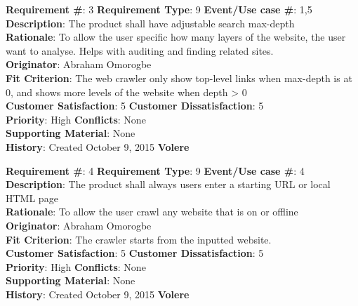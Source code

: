 \documentclass[12pt]{article}
\begin{document}
\begin{framed}
\textbf{Requirement \#}: 3 \hfill \textbf{Requirement Type}: 9 \hfill\textbf{Event/Use case \#}: 1,5 \hfill\\
\textbf{Description}:  The product shall have adjustable search max-depth\\
\textbf{Rationale}: To allow the user specific how many layers of the website, the user want to analyse. Helps with auditing and finding related sites.\\
\textbf{Originator}: Abraham Omorogbe\\
\textbf{Fit Criterion}: The web crawler only show top-level links when max-depth is at 0, and shows more levels of the website when depth > 0\\
\textbf{Customer Satisfaction}: 5 \hfill 	\textbf{Customer Dissatisfaction}: 5 \hfill\\
\textbf{Priority}: High \hfill \textbf{Conflicts}: None \hfill 		\\
\textbf{Supporting Material}: None\\
\textbf{History}: Created October 9, 2015 \hfill	 \textbf{Volere}\hfill

\end{framed}

\begin{framed}
\textbf{Requirement \#}: 4 \hfill \textbf{Requirement Type}: 9 \hfill\textbf{Event/Use case \#}: 4 \hfill\\
\textbf{Description}:  The product shall always users enter a starting URL or local HTML page\\
\textbf{Rationale}: To allow the user crawl any website that is on or offline\\
\textbf{Originator}: Abraham Omorogbe\\
\textbf{Fit Criterion}: The crawler starts from the inputted website.\\
\textbf{Customer Satisfaction}: 5 \hfill 	\textbf{Customer Dissatisfaction}: 5 \hfill\\
\textbf{Priority}: High \hfill \textbf{Conflicts}: None \hfill 		\\
\textbf{Supporting Material}: None\\
\textbf{History}: Created October 9, 2015 \hfill	 \textbf{Volere}\hfill

\end{framed}
\end{document}

